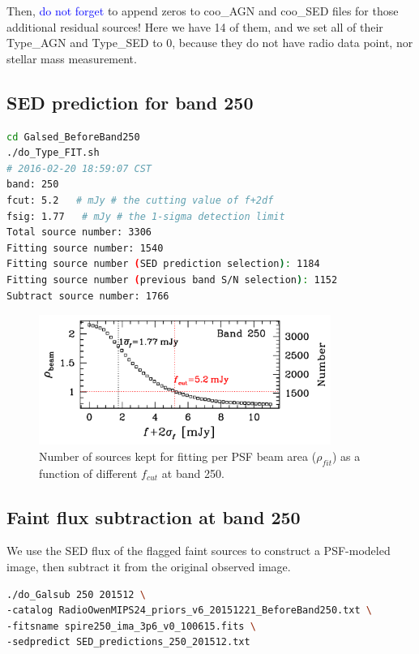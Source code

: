 \documentclass[11pt,a4paper]{article}
\begin{document}
Then, \textcolor{blue}{do not forget} to append zeros to coo\_AGN and coo\_SED files for those additional residual sources! Here we have 14 of them, and we set all of their Type\_AGN and Type\_SED to 0, because they do not have radio data point, nor stellar mass measurement. 

\subsection{SED prediction for band 250}
\label{Band250_Galpre}

\begin{lstlisting}[language=bash]
cd Galsed_BeforeBand250
./do_Type_FIT.sh
# 2016-02-20 18:59:07 CST
band: 250
fcut: 5.2   # mJy # the cutting value of f+2df
fsig: 1.77   # mJy # the 1-sigma detection limit
Total source number: 3306
Fitting source number: 1540
Fitting source number (SED prediction selection): 1184
Fitting source number (previous band S/N selection): 1152
Subtract source number: 1766
\end{lstlisting}

\begin{figure}[H]
	\caption{Number of sources kept for fitting per PSF beam area ($\rho_{fit}$) as a function of different $f_{cut}$ at band 250.}
	\includegraphics[width=0.85\textwidth]{plot_cutting_flux_250}
\end{figure}

\subsection{Faint flux subtraction at band 250}
\label{Band250_Galsub}

We use the SED flux of the flagged faint sources to construct a PSF-modeled image, then subtract it from the original observed image. 

\begin{lstlisting}[language=bash]
./do_Galsub 250 201512 \
-catalog RadioOwenMIPS24_priors_v6_20151221_BeforeBand250.txt \
-fitsname spire250_ima_3p6_v0_100615.fits \
-sedpredict SED_predictions_250_201512.txt
\end{lstlisting}
\end{document}
